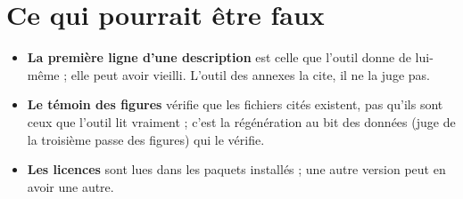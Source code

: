 \section*{Ce qui pourrait être faux}

\begin{faux}
\begin{itemize}
\item \textbf{La première ligne d'une description} est celle que l'outil donne de lui-même ; elle peut avoir vieilli. L'outil des annexes la cite, il ne la juge pas.
\item \textbf{Le témoin des figures} vérifie que les fichiers cités existent, pas qu'ils sont ceux que l'outil lit vraiment ; c'est la régénération au bit des données (juge de la troisième passe des figures) qui le vérifie.
\item \textbf{Les licences} sont lues dans les paquets installés ; une autre version peut en avoir une autre.
\end{itemize}
\end{faux}
